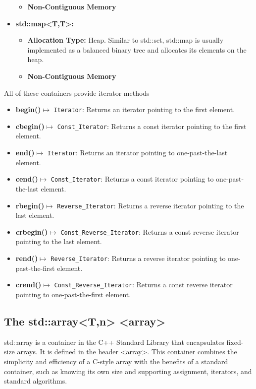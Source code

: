 \documentclass{report}
\begin{document}
\begin{itemize}
\begin{itemize}
            \item \textbf{Non-Contiguous Memory}
        \end{itemize}
        \item \textbf{std::map<T,T>:}
        \begin{itemize}
            \item \textbf{Allocation Type:} Heap. Similar to std::set, std::map is usually implemented as a balanced binary tree and allocates its elements on the heap.
            \item \textbf{Non-Contiguous Memory}
        \end{itemize}
    \end{itemize}
    \bigbreak \noindent 
    \begin{notebox}
       All of these containers provide iterator methods 
       \begin{itemize}
           \item \textbf{begin()}\(\mapsto\) \texttt{Iterator}: Returns an iterator pointing to the first element.
            \item \textbf{cbegin()}\(\mapsto\) \texttt{Const\_Iterator}: Returns a const iterator pointing to the first element.
            \item \textbf{end()}\(\mapsto\) \texttt{Iterator}: Returns an iterator pointing to one-past-the-last element.
            \item \textbf{cend()}\(\mapsto\) \texttt{Const\_Iterator}: Returns a const iterator pointing to one-past-the-last element.
            \item \textbf{rbegin()}\(\mapsto\) \texttt{Reverse\_Iterator}: Returns a reverse iterator pointing to the last element.
            \item \textbf{crbegin()}\(\mapsto\) \texttt{Const\_Reverse\_Iterator}: Returns a const reverse iterator pointing to the last element.
            \item \textbf{rend()}\(\mapsto\) \texttt{Reverse\_Iterator}: Returns a reverse iterator pointing to one-past-the-first element.
            \item \textbf{crend()}\(\mapsto\) \texttt{Const\_Reverse\_Iterator}: Returns a const reverse iterator pointing to one-past-the-first element.
       \end{itemize}
    \end{notebox}
    

    \pagebreak
    \subsection{The std::array<T,n> <array>}
    \bigbreak \noindent 
    \begin{concept}
     std::array is a container in the C++ Standard Library that encapsulates fixed-size arrays. It is defined in the header <array>. This container combines the simplicity and efficiency of a C-style array with the benefits of a standard container, such as knowing its own size and supporting assignment, iterators, and standard algorithms.       
    \end{concept}
\end{document}
